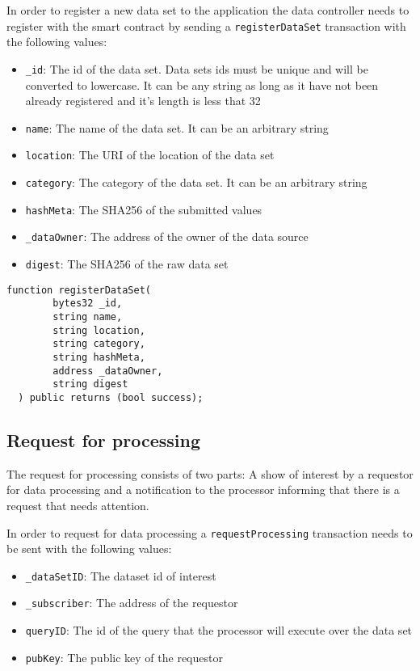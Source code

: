 In order to register a new data set to the application the data controller needs to register with the smart contract by sending a \verb|registerDataSet| transaction with the following values:

\begin{itemize}
  \item \verb|_id|: The id of the data set. Data sets ids must be unique and will be converted to lowercase. It can be any string as long as it have not been already registered and it's length is less that 32
  \item \verb|name|: The name of the data set. It can be an arbitrary string
  \item \verb|location|: The URI of the location of the data set
  \item \verb|category|: The category of the data set. It can be an arbitrary string
  \item \verb|hashMeta|: The SHA256 of the submitted values
  \item \verb|_dataOwner|: The address of the owner of the data source
  \item \verb|digest|: The SHA256 of the raw data set
\end{itemize}

\begin{lstlisting}[language=Solidity, caption={Data set registration function}]
  function registerDataSet(
        bytes32 _id,
        string name,
        string location,
        string category,
        string hashMeta,
        address _dataOwner,
        string digest
  ) public returns (bool success);
\end{lstlisting}

\subsection{Request for processing}
\label{implemenation:contracts:req_pr}

The request for processing consists of two parts: A show of interest by a requestor for data processing and a notification to the processor informing that there is a request that needs attention.

In order to request for data processing a \verb|requestProcessing| transaction needs to be sent with the following values:

\begin{itemize}
  \item \verb|_dataSetID|: The dataset id of interest
  \item \verb|_subscriber|: The address of the requestor
  \item \verb|queryID|: The id of the query that the processor will execute over the data set
  \item \verb|pubKey|: The public key of the requestor
\end{itemize}

